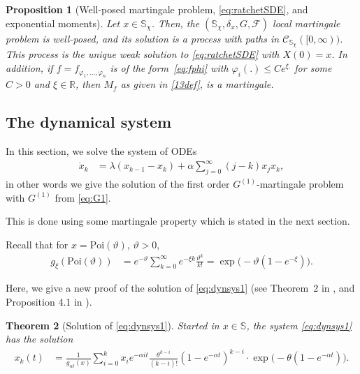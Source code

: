 \documentclass{imsart}
\theoremstyle{plain}
\newtheorem{theorem}{Theorem}[section]
\newtheorem{proposition}[theorem]{Proposition}
\theoremstyle{definition}
\begin{document}
\begin{proposition}  [Well-posed martingale problem, \eqref{eq:ratchetSDE}, and exponential moments]\label{martprob}
    Let $x \in \mathbb S_{\chi}$. Then, the $(\mathbb S_{\chi}, \delta_x, G, \mathcal F)$ local martingale problem is well-posed, and its solution is a process with paths in $\mathcal C_{\mathbb S_{\chi}}([0, \infty))$. This process is the unique weak solution to \eqref{eq:ratchetSDE} with $X(0) = x$. In addition, if $f = f_{\varphi_1,..., \varphi_n}$ is of the form~\eqref{eq:fphi} with $\varphi_i(.) \leq Ce^{\xi .}$ for some $C>0$ and $\xi \in \mathbb R$, then $M_f$ as given in \eqref{13def}, is a martingale. 
\end{proposition}

\subsection{The dynamical system}
\label{ss:dyn}
In this section, we solve the system of ODEs
\begin{align}
  \label{eq:dynsys1}
  \dot x_k & = \lambda(x_{k-1}-x_k) + \alpha \sum_{j=0}^\infty (j - k) x_j x_k,
\end{align}
in other words we give the solution of the first order $G^{(1)}$-martingale problem with $G^{(1)}$ from \eqref{eq:G1}. 



\noindent
This is done using some martingale property which is stated in the
next section. 

Recall that for $x = \text{Poi}(\vartheta)$, $\vartheta > 0$,
\begin{align}
    \label{eq:hxiPoi}
    g_{\xi}(\text{Poi}(\vartheta)) & = e^{-\vartheta} \sum_{k=0}^\infty e^{- \xi k } \frac{\vartheta^k}{k!} = \exp\big(-\vartheta ( 1 - e^{- \xi})\big).
\end{align}

\noindent
Here, we give a new proof of the solution of \eqref{eq:dynsys1} (see Theorem~2 in \cite{pfaffelhuber2012muller}, and Proposition 4.1 in \cite{EtheridgePfaffelhuberWakolbinger2007}). 

\begin{theorem}[Solution of \eqref{eq:dynsys1}]\label{T2}
  Started in $x \in \mathbb S$, the system \eqref{eq:dynsys1} has the solution
  \begin{align}\label{eq:sol0}
    x_k(t) & = \frac{1}{g_{\alpha t}(x)} \sum_{i=0}^k x_i e^{-\alpha i t}
      \frac{\theta^{k-i}}{(k-i)!} (1-e^{-\alpha t})^{k-i} \cdot \exp\Big(
    -\theta(1-e^{-\alpha t})\Big).
  \end{align}
\end{theorem}
\end{document}
